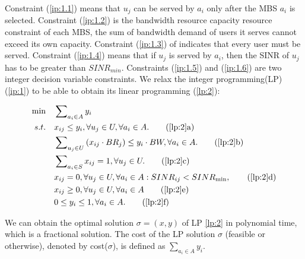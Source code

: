 \documentclass[journal]{IEEEtran}
\begin{document}
Constraint (\ref{ip:1.1}) means that $u_j$ can be served by $a_i$ only after the MBS $a_i$ is selected. Constraint (\ref{ip:1.2}) is the bandwidth resource capacity resource constraint of each MBS, the sum of bandwidth demand of users it serves cannot exceed its own capacity. Constraint (\ref{ip:1.3}) of indicates that every user must be served. Constraint (\ref{ip:1.4}) means that if $u_j$ is served by $a_i$, then the SINR of $u_j$ has to be greater than $SINR_{min}$. Constraints (\ref{ip:1.5}) and (\ref{ip:1.6}) are two integer decision variable constraints. We relax the integer programming(LP) (\ref{ip:1}) to be able to obtain its linear programming (\ref{lp:2}):

\begin{align}
	\min \quad & \sum\nolimits_{{a_i} \in A} {{y_i}}  \label{lp:2}\\
	s.t.\quad &  {x_{ij}} \le {y_i},\forall {u_j} \in U,\forall {a_i} \in A. \tag{\ref{lp:2}{a}}\label{lp:2.1}\\
	&  \sum\nolimits_{{u_j} \in U} {({x_{ij}} \cdot B{R_j})}  \le {y_i} \cdot BW,\forall {a_i} \in A. \tag{\ref{lp:2}{b}}\label{lp:2.2}\\
	&  \sum\nolimits_{{a_i} \in S} {{x_{ij}}}  = 1,\forall {u_j} \in U. \tag{\ref{lp:2}{c}}\label{lp:2.3}\\
	&  {x_{ij}} = 0,\forall {u_j} \in U,\forall {a_i} \in A:SIN{R_{ij}} < SIN{R_{\min }}, \tag{\ref{lp:2}{d}}\label{lp:2.4}\\
	&  {x_{ij}} \ge 0,\forall u_j \in U,\forall {a_i} \in A \tag{\ref{lp:2}{e}}\label{lp:2.5}\\
	&  0 \le {y_i} \le 1,\forall {a_i} \in A. \tag{\ref{lp:2}{f}}\label{lp:2.6}
\end{align}

We can obtain the optimal solution $\sigma=(x,y)$ of LP \ref{lp:2} in polynomial time, which is a fractional solution. The cost of the LP solution $\sigma$ (feasible or otherwise), denoted by cost($\sigma$), is defined as $\sum\nolimits_{{a_i} \in A} {{y_i}}$.
\end{document}

